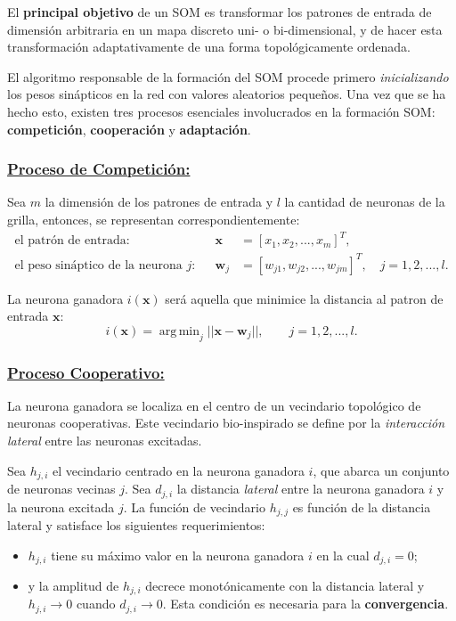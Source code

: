 \documentclass[10pt,a4paper]{article}
\DeclareMathOperator*{\argmin}{arg\,\min}
\begin{document}
El \textbf{principal objetivo} de un SOM es transformar los patrones de entrada de dimensión arbitraria en un mapa discreto uni- o bi-dimensional, y de hacer esta transformación adaptativamente de una forma topológicamente ordenada.

El algoritmo responsable de la formación del SOM procede primero \textit{inicializando} los pesos sinápticos en la red con valores aleatorios pequeños. Una vez que se ha hecho esto, existen tres procesos esenciales involucrados en la formación SOM: \textbf{competición}, \textbf{cooperación} y \textbf{adaptación}.

\subsubsection*{\underline{Proceso de Competición:}}

Sea $m$ la dimensión de los patrones de entrada y $l$ la cantidad de neuronas de la grilla, entonces, se representan correspondientemente:
\begin{align*}
\text{el patrón de entrada:}&& \mathbf{x}&=[x_1, x_2, ..., x_m]^T ,\\
\text{el peso sináptico de la neurona $j$:}&& \mathbf{w}_j&=[w_{j1}, w_{j2}, ..., w_{jm}]^T, \quad j=1, 2, ..., l.
\end{align*}

La neurona ganadora $i(\mathbf{x})$ será aquella que minimice la distancia al patron de entrada $\mathbf{x}$:
\[
i(\mathbf{x}) = \argmin_j ||\mathbf{x}-\mathbf{w}_j||, \qquad j=1,2,...,l.
\]

\subsubsection*{\underline{Proceso Cooperativo:}}

La neurona ganadora se localiza en el centro de un vecindario topológico de neuronas cooperativas. Este vecindario bio-inspirado se define por la \textit{interacción lateral} entre las neuronas excitadas.

Sea $h_{j,i}$ el vecindario centrado en la neurona ganadora $i$, que abarca un conjunto de neuronas vecinas $j$. Sea $d_{j,i}$ la distancia \textit{lateral} entre la neurona ganadora $i$ y la neurona excitada $j$. La función de vecindario $h_{j,j}$ es función de la distancia lateral y satisface los siguientes requerimientos:
\begin{itemize}
\item $h_{j,i}$ tiene su máximo valor en la neurona ganadora $i$ en la cual $d_{j,i}=0$;
\item y la amplitud de $h_{j,i}$ decrece monotónicamente con la distancia lateral y $h_{j,i}\rightarrow 0$ cuando $d_{j,i}\rightarrow 0$. Esta condición es necesaria para la \textbf{convergencia}.
\end{itemize}
\end{document}
